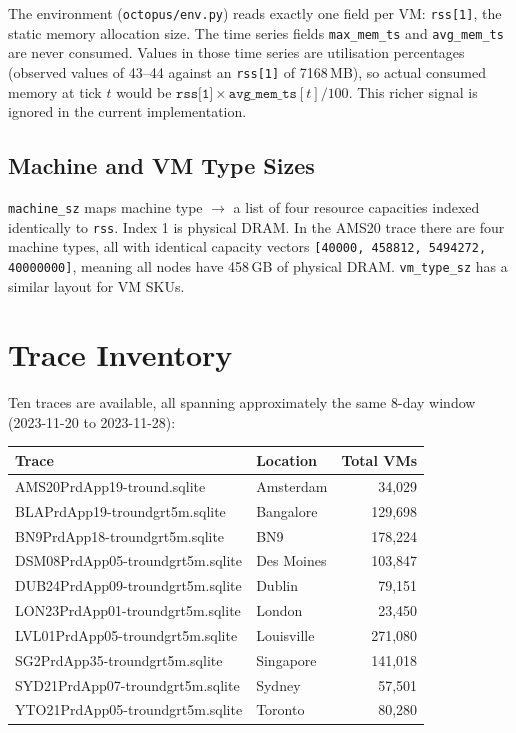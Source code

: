 \documentclass[11pt]{article}
\begin{document}
The environment (\texttt{octopus/env.py}) reads exactly one field per
VM: \texttt{rss[1]}, the static memory allocation size. The time
series fields \texttt{max\_mem\_ts} and \texttt{avg\_mem\_ts} are never
consumed. Values in those time series are utilisation percentages
(observed values of 43--44 against an \texttt{rss[1]} of 7168\,MB),
so actual consumed memory at tick $t$ would be
$\texttt{rss[1]} \times \texttt{avg\_mem\_ts}[t] / 100$. This richer
signal is ignored in the current implementation.

\subsection{Machine and VM Type Sizes}

\texttt{machine\_sz} maps machine type $\to$ a list of four resource
capacities indexed identically to \texttt{rss}. Index 1 is physical
DRAM. In the AMS20 trace there are four machine types, all with
identical capacity vectors \texttt{[40000, 458812, 5494272,
40000000]}, meaning all nodes have 458\,GB of physical DRAM.
\texttt{vm\_type\_sz} has a similar layout for VM SKUs.

\section{Trace Inventory}

Ten traces are available, all spanning approximately the same 8-day
window (2023-11-20 to 2023-11-28):

\begin{center}
\begin{tabular}{llr}
\toprule
Trace & Location & Total VMs \\
\midrule
AMS20PrdApp19-tround.sqlite & Amsterdam & 34,029 \\
BLAPrdApp19-troundgrt5m.sqlite & Bangalore & 129,698 \\
BN9PrdApp18-troundgrt5m.sqlite & BN9 & 178,224 \\
DSM08PrdApp05-troundgrt5m.sqlite & Des Moines & 103,847 \\
DUB24PrdApp09-troundgrt5m.sqlite & Dublin & 79,151 \\
LON23PrdApp01-troundgrt5m.sqlite & London & 23,450 \\
LVL01PrdApp05-troundgrt5m.sqlite & Louisville & 271,080 \\
SG2PrdApp35-troundgrt5m.sqlite & Singapore & 141,018 \\
SYD21PrdApp07-troundgrt5m.sqlite & Sydney & 57,501 \\
YTO21PrdApp05-troundgrt5m.sqlite & Toronto & 80,280 \\
\bottomrule
\end{tabular}
\end{center}
\end{document}
